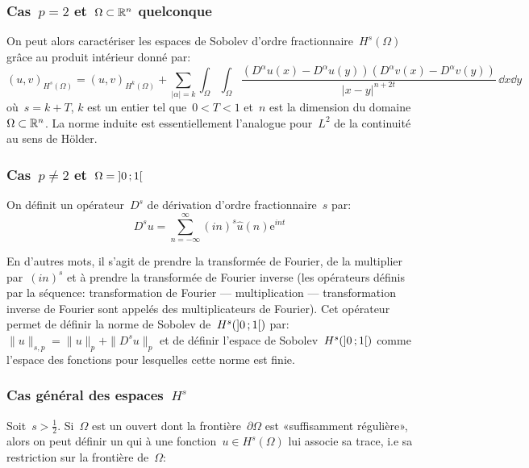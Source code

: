 \medskip
\subsubsection{Cas~$p=2$ et~$\Omega \subset \mathbb R^{n}$ quelconque}
On peut alors caractériser les espaces de Sobolev d'ordre fractionnaire~$H^s(\Omega)$ grâce au produit intérieur donné par:
\begin{equation}
(u, v)_{H^{s} (\Omega)} = (u,v)_{H^{k} (\Omega)} + \sum_{| \alpha | = k} \int_{\Omega} \int_{\Omega} \frac{( D^{\alpha}u (x) - D^{\alpha}u (y) ) (D^{\alpha}v (x) - D^{\alpha}v (y) )}{| x - y |^{n + 2 t}} \, \dd x \dd y
\end{equation}
où~$s = k + T$, $k$ est un entier tel que~$0 < T < 1$ et~$n$ est la dimension du domaine $\Omega \subset \mathbb R^{n}$.
La norme induite est essentiellement l'analogue pour~$L^2$ de la continuité au sens de Hölder.

\medskip
\subsubsection{Cas~$p\neq 2$ et~$\Omega = \mathopen{]}0\,;1\mathclose{[}$}

On définit un opérateur~$D^s$ de dérivation d'ordre fractionnaire~$s$ par:
\begin{equation}
D^{s}u=\sum_{n=-\infty}^\infty (in)^s\widehat{u}(n)\mathrm{e}^{int}
\end{equation}

En d'autres mots, il s'agit de prendre la transformée de Fourier, de la multiplier par~$(in)^s$ et à prendre la transformée de Fourier inverse (les opérateurs définis par la séquence: transformation de Fourier --- multiplication --- transformation inverse de Fourier sont appelés des multiplicateurs de Fourier).
Cet opérateur permet de définir la norme de Sobolev de~$H^s(\mathopen{]}0\,;1\mathclose{[})$ par: 
$\|u\|_{s,p}=\|u\|_p+\|D^s u\|_p$ et de définir l'espace de Sobolev~$H^s(\mathopen{]}0\,;1\mathclose{[})$
comme l'espace des fonctions pour lesquelles cette norme est finie.

\medskip
\subsubsection{Cas général des espaces~$H^s$}

Soit~$s > \frac{1}{2}$. Si~$\Omega$ est un ouvert dont la frontière~$\partial \Omega$ est «suffisamment régulière», alors on peut définir un  qui à une fonction~$u \in H^{s}(\Omega)$ lui associe sa trace, i.e sa restriction sur la frontière de~$\Omega$: 

